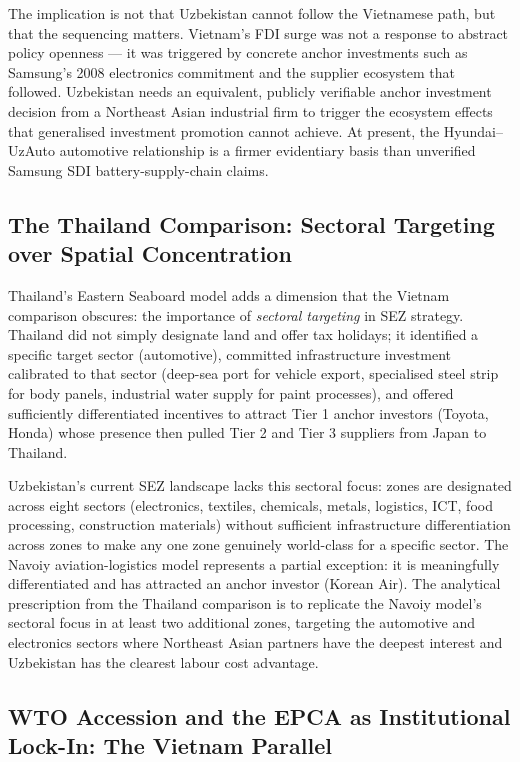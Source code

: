 The implication is not that Uzbekistan cannot follow the Vietnamese path, but that the sequencing matters. Vietnam's FDI surge was not a response to abstract policy openness --- it was triggered by concrete anchor investments such as Samsung's 2008 electronics commitment and the supplier ecosystem that followed. Uzbekistan needs an equivalent, publicly verifiable anchor investment decision from a Northeast Asian industrial firm to trigger the ecosystem effects that generalised investment promotion cannot achieve. At present, the Hyundai--UzAuto automotive relationship is a firmer evidentiary basis than unverified Samsung SDI battery-supply-chain claims.

\subsection{The Thailand Comparison: Sectoral Targeting over Spatial Concentration}

Thailand's Eastern Seaboard model adds a dimension that the Vietnam comparison obscures: the importance of \textit{sectoral targeting} in SEZ strategy. Thailand did not simply designate land and offer tax holidays; it identified a specific target sector (automotive), committed infrastructure investment calibrated to that sector (deep-sea port for vehicle export, specialised steel strip for body panels, industrial water supply for paint processes), and offered sufficiently differentiated incentives to attract Tier 1 anchor investors (Toyota, Honda) whose presence then pulled Tier 2 and Tier 3 suppliers from Japan to Thailand.

Uzbekistan's current SEZ landscape lacks this sectoral focus: zones are designated across eight sectors (electronics, textiles, chemicals, metals, logistics, ICT, food processing, construction materials) without sufficient infrastructure differentiation across zones to make any one zone genuinely world-class for a specific sector. The Navoiy aviation-logistics model represents a partial exception: it is meaningfully differentiated and has attracted an anchor investor (Korean Air). The analytical prescription from the Thailand comparison is to replicate the Navoiy model's sectoral focus in at least two additional zones, targeting the automotive and electronics sectors where Northeast Asian partners have the deepest interest and Uzbekistan has the clearest labour cost advantage.

\subsection{WTO Accession and the EPCA as Institutional Lock-In: The Vietnam Parallel}

